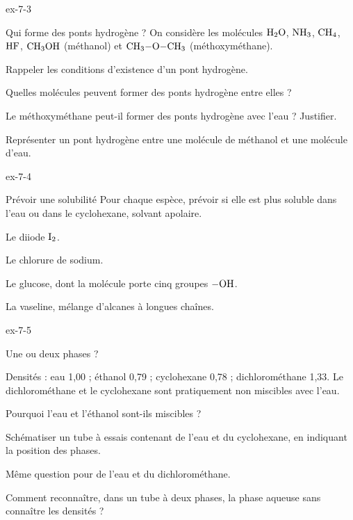 \begin{blocLivre}{ex-7-3}
\begin{exercice}[1]{Qui forme des ponts hydrogène ?}
On considère les molécules $\ce{H2O}$, $\ce{NH3}$, $\ce{CH4}$, $\ce{HF}$, $\ce{CH3OH}$ (méthanol) et $\ce{CH3-O-CH3}$ (méthoxyméthane).
\begin{questions}
\item Rappeler les conditions d'existence d'un pont hydrogène.
\item Quelles molécules peuvent former des ponts hydrogène entre elles ?
\item Le méthoxyméthane peut-il former des ponts hydrogène avec l'eau ? Justifier.
\item Représenter un pont hydrogène entre une molécule de méthanol et une molécule d'eau.
\end{questions}
\end{exercice}
\end{blocLivre}
\begin{blocLivre}{ex-7-4}
\begin{exercice}[1]{Prévoir une solubilité}
Pour chaque espèce, prévoir si elle est plus soluble dans l'eau ou dans le cyclohexane, solvant apolaire.
\begin{questions}
\item Le diiode $\ce{I2}$.
\item Le chlorure de sodium.
\item Le glucose, dont la molécule porte cinq groupes $\ce{-OH}$.
\item La vaseline, mélange d'alcanes à longues chaînes.
\end{questions}
\end{exercice}
\end{blocLivre}
\begin{blocLivre}{ex-7-5}
\begin{exercice}[1]{Une ou deux phases ?}
\begin{donnees}
Densités : eau 1,00 ; éthanol 0,79 ; cyclohexane 0,78 ; dichlorométhane 1,33. Le dichlorométhane et le cyclohexane sont
pratiquement non miscibles avec l'eau.
\end{donnees}
\begin{questions}
\item Pourquoi l'eau et l'éthanol sont-ils miscibles ?
\item Schématiser un tube à essais contenant de l'eau et du cyclohexane, en indiquant la position des phases.
\item Même question pour de l'eau et du dichlorométhane.
\item Comment reconnaître, dans un tube à deux phases, la phase aqueuse sans connaître les densités ?
\end{questions}
\end{exercice}
\end{blocLivre}
